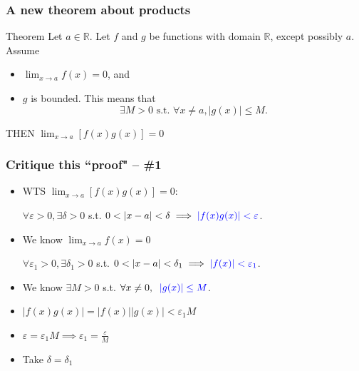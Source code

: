 \documentclass[14pt]{beamer}
\newcommand {\DS} [1] {${\displaystyle #1}$}
\newcommand {\R}{\mathbb{R}}
\newcommand{\e}{\varepsilon}
\newcommand{\azul}[1]{{\color{blue} #1}}
\newcommand{\setsize}[1]{\fontsize{#1}{#1}\selectfont} %
\newcommand{\smallerfont}{\setsize{13}} %
\begin{document}
\begin{frame}[t]
\frametitle{A new theorem about products}
\smallerfont
\begin{block}{Theorem}
Let $a \in \R$.  Let $f$ and $g$ be functions with domain $\R$, except possibly $a$. 
 Assume
	\begin{itemize}
		\item  \DS{\lim_{x \to a} f(x) = 0}, and
		\item $g$ is bounded. 
			This means that 
			$$\exists M >0 \mbox{ s.t. } \forall x \neq a, |g(x)| \leq M.$$
	\end{itemize}
THEN  \DS{\lim_{x \to a} \left[ f(x) g(x) \right] = 0}
\end{block}


\end{frame}
\begin{frame}[t]
\frametitle{Critique this ``proof" -- \#1}
\smallerfont
\begin{itemize}
	\item  WTS \DS{\lim_{x \to a} \left[ f(x) g(x) \right] = 0}:
	
		\hfill \DS{\forall \e>0, \exists \delta>0} \; s.t. \; \DS{0<|x-a|<\delta \implies \azul{|f(x) g(x)| < \e}}. 
\vfill	
	\item  We know \DS{\lim_{x \to a} f(x) = 0}
	
		\hfill \DS{\forall \e_1>0, \exists \delta_1 >0 } \; s.t. \; \DS{0<|x-a|<\delta_1 \implies \azul{|f(x)| <\e_1}}.
\vfill
	\item   We know \hfill \DS{\exists M>0} \; s.t. \; \DS{\forall x \neq 0, \; \; \azul{|g(x)| \leq M}}.
\vfill
	\item  \DS{|f(x)g(x)| = |f(x)||g(x)| < \e_1 M}
\vfill
	\item \DS{\e = \e_1 M \implies \e_1 = \frac{\e}{M}}
\vfill
	\item Take  \DS{\delta = \delta_1}
\vfill
\end{itemize}
\end{frame}
\end{document}
